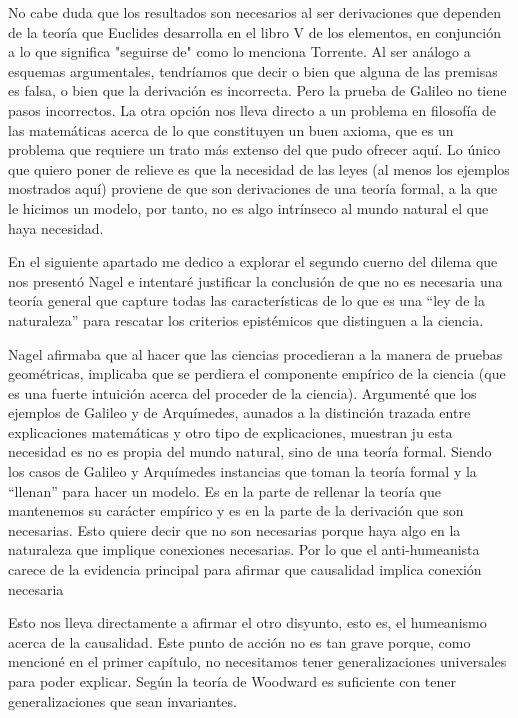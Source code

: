 No cabe duda que los resultados son necesarios al ser derivaciones que dependen de la teoría que Euclides desarrolla en el libro V de los elementos, en conjunción a lo que significa "seguirse de" como lo menciona Torrente. Al ser análogo a esquemas argumentales, tendríamos que decir o bien que alguna de las premisas es falsa, o bien que la derivación es incorrecta. Pero la prueba de Galileo no tiene pasos incorrectos. La otra opción nos lleva directo a un problema en filosofía de las matemáticas acerca de lo que constituyen un buen axioma, que es un problema que requiere un trato más extenso del que pudo ofrecer aquí. Lo único que quiero poner de relieve es que la necesidad de las leyes (al menos los ejemplos mostrados aquí) proviene de que son derivaciones de una teoría formal, a la que le hicimos un modelo, por tanto, no es algo intrínseco al mundo natural el que haya necesidad.

En el siguiente apartado me dedico a explorar el segundo cuerno del dilema que nos presentó Nagel e intentaré justificar la conclusión de que no es necesaria una teoría general que capture todas las características de lo que es una ``ley de la naturaleza'' para rescatar los criterios epistémicos que distinguen a la ciencia.

Nagel afirmaba que al hacer que las ciencias procedieran a la manera de pruebas geométricas, implicaba que se perdiera el componente empírico de la ciencia (que es una fuerte intuición acerca del proceder de la ciencia). Argumenté que los ejemplos de Galileo y de Arquímedes, aunados a la distinción trazada entre explicaciones matemáticas y otro tipo de explicaciones,  muestran ju esta necesidad es no es propia del mundo natural, sino de una teoría formal. Siendo los casos de Galileo y Arquímedes instancias que toman la teoría formal y la ``llenan'' para hacer un modelo. Es en la parte de rellenar la teoría que mantenemos su carácter empírico y es en la parte de la derivación que son necesarias. Esto quiere decir que no son necesarias porque haya algo en la naturaleza que implique conexiones necesarias. Por lo que el anti-humeanista carece de la evidencia principal para afirmar que causalidad implica conexión necesaria

Esto nos lleva directamente a afirmar el otro disyunto, esto es, el humeanismo acerca de la causalidad. Este punto de acción no es tan grave porque, como mencioné en el primer capítulo, no necesitamos tener generalizaciones universales para poder explicar. Según la teoría de Woodward es suficiente con tener generalizaciones que sean invariantes.

